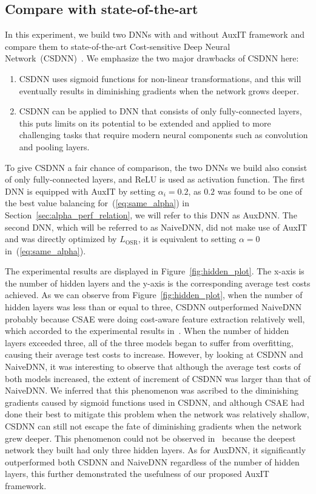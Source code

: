 \documentclass[a4paper]{article}
\begin{document}
\subsection{Compare with state-of-the-art}
  \label{sec:FC_compare}
  In this experiment, we build two DNNs with and without AuxIT framework and compare them to state-of-the-art Cost-sensitive Deep Neural Network~(CSDNN)~\cite{YC2016}.
  We emphasize the two major drawbacks of CSDNN here:
  \begin{enumerate}
    \item CSDNN uses sigmoid functions for non-linear transformations, and this will eventually results in diminishing gradients when the network grows deeper.
    \item CSDNN can be applied to DNN that consists of only fully-connected layers, this puts limits on its potential to be extended and applied to more challenging tasks that require modern neural components such as convolution and pooling layers.
  \end{enumerate}
  To give CSDNN a fair chance of comparison, the two DNNs we build also consist of only fully-connected layers, and ReLU is used as activation function.
  The first DNN is equipped with AuxIT by setting $\alpha_{i} = 0.2$, as $0.2$ was found to be one of the best value balancing for~(\ref{eq:same_alpha}) in Section~\ref{sec:alpha_perf_relation}, we will refer to this DNN as AuxDNN.
  The second DNN, which will be referred to as NaiveDNN, did not make use of AuxIT and was directly optimized by $L_{\mathrm{OSR}}$, it is equivalent to setting $\alpha = 0$ in~(\ref{eq:same_alpha}).

  The experimental results are displayed in Figure~\ref{fig:hidden_plot}.
  The x-axis is the number of hidden layers and the y-axis is the corresponding average test costs achieved.
  As we can observe from Figure~\ref{fig:hidden_plot}, when the number of hidden layers was less than or equal to three, CSDNN outperformed NaiveDNN probably because CSAE were doing cost-aware feature extraction relatively well, which accorded to the experimental results in~\cite{YC2016}.
  When the number of hidden layers exceeded three, all of the three models began to suffer from overfitting, causing their average test costs to increase.
  However, by looking at CSDNN and NaiveDNN, it was interesting to observe that although the average test costs of both models increased, the extent of increment of CSDNN was larger than that of NaiveDNN.
  We inferred that this phenomenon was ascribed to the diminishing gradients caused by sigmoid functions used in CSDNN, and although CSAE had done their best to mitigate this problem when the network was relatively shallow, CSDNN can still not escape the fate of diminishing gradients when the network grew deeper.
  This phenomenon could not be observed in~\cite{YC2016} because the deepest network they built had only three hidden layers.
  As for AuxDNN, it significantly outperformed both CSDNN and NaiveDNN regardless of the number of hidden layers, this further demonstrated the usefulness of our proposed AuxIT framework.
\end{document}
